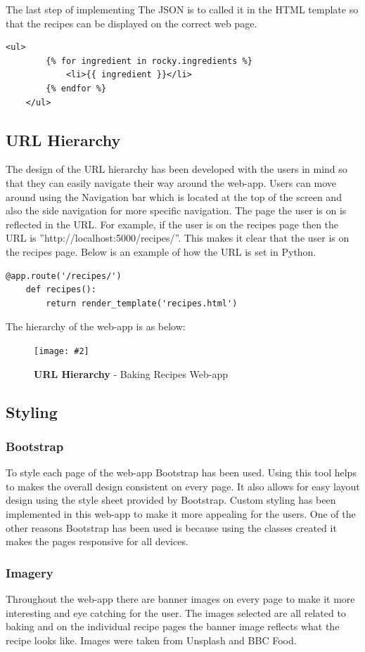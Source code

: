 \documentclass[10pt, a4paper]{article}
\newcommand{\figuremacro}[5]{
    \begin{figure}[#1]
        \centering
        \texttt{[image: \#2]}
        \caption[#3]{\textbf{#3}#4}
        \label{fig:#2}
    \end{figure}
}
\begin{document}
    The last step of implementing The JSON is to called it in the HTML template so that the recipes can be displayed on the correct web page.
    \begin{lstlisting}[caption = JSON in HTML Template]
    <ul>
        {% for ingredient in rocky.ingredients %}
            <li>{{ ingredient }}</li>
        {% endfor %}
    </ul>
    \end{lstlisting}

	\subsection{URL Hierarchy}
	The design of the URL hierarchy has been developed with the users in mind so that they can easily navigate their way around the web-app. Users can move around using the Navigation bar which is located at the top of the screen and also the side navigation for more specific navigation. The page the user is on is reflected in the URL. For example, if the user is on the recipes page then the URL is ''http://localhost:5000/recipes/''. This makes it clear that the user is on the recipes page. Below is an example of how the URL is set in Python.
	\begin{lstlisting}[caption = Recipes URL Hierarchy in Python Flask]
    @app.route('/recipes/')
    def recipes():
        return render_template('recipes.html')
    \end{lstlisting}
	The hierarchy of the web-app is as below:  
	\figuremacro{h}{url_hierarchy}{URL Hierarchy}{ - Baking Recipes Web-app }{1.0}
	
	\subsection{Styling}
    \subsubsection{Bootstrap}
    To style each page of the web-app Bootstrap has been used. Using this tool helps to makes the overall design consistent on every page. It also allows for easy layout design using the style sheet provided by Bootstrap. Custom styling has been implemented in this web-app to make it more appealing for the users. One of the other reasons Bootstrap has been used is because using the classes created it makes the pages responsive for all devices.

    \vfill\null \columnbreak
    \subsubsection{Imagery}
    Throughout the web-app there are banner images on every page to make it more interesting and eye catching for the user. The images selected are all related to baking and on the individual recipe pages the banner image reflects what the recipe looks like. Images were taken from Unsplash\cite{Unsplash} and BBC Food\cite{bbc}.  
 
\end{document}
